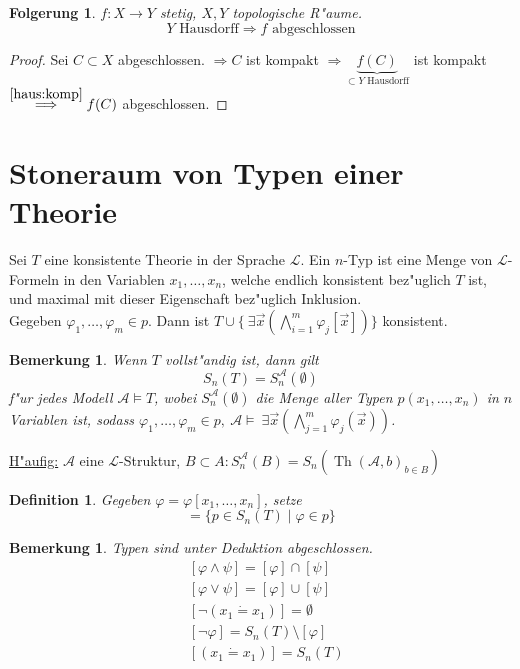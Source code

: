 \documentclass[a4paper,12pt,numbers=noenddot,parskip=full]{scrartcl}
\newcommand{\Exists}{~\exists}
\newcommand{\scrL}{\mathcal{L}}
\newcommand{\scrA}{\mathcal{A}}
\newcommand{\heading}{\underline}
\DeclareMathOperator{\Th}{Th}
\theoremstyle{dotless}
\newtheorem{corollary}[theorem]{Folgerung}
\newtheorem{definition}[theorem]{Definition}
\newtheorem{remark}[theorem]{Bemerkung}
\begin{document}
\begin{corollary}\label{huk}
	$f: X \longrightarrow Y$ stetig, $X, Y$ topologische R"aume.
	\begin{equation*}
		Y \text{ Hausdorff} \Longrightarrow f \text{ abgeschlossen}
	\end{equation*}
\end{corollary}
\begin{proof}
	Sei $C \subset X$ abgeschlossen. $\Longrightarrow C$ ist kompakt $\Longrightarrow \underbrace{f(C)}_{\subset Y \text{ Hausdorff}}$ ist kompakt $\overset{\eqref{haus:komp}}{\Longrightarrow} f(C)$ abgeschlossen.
\end{proof}

\section{Stoneraum von Typen einer Theorie}
Sei $T$ eine konsistente Theorie in der Sprache $\scrL$. Ein $n$-Typ ist eine Menge von $\scrL$-Formeln in den Variablen $x_1, \dots, x_n$, welche endlich konsistent bez"uglich $T$ ist, und maximal mit dieser Eigenschaft bez"uglich Inklusion.\\
Gegeben $\varphi_1, \dots, \varphi_m \in p$. Dann ist $T \cup \{\Exists \vec{x} (\bigwedge\limits_{i=1}^m \varphi_j[\vec{x}]) \}$ konsistent.
\begin{remark}
	Wenn $T$ vollst"andig ist, dann gilt
	\begin{equation*}
		S_n(T) = S^\scrA_n(\emptyset)
	\end{equation*}
	f"ur jedes Modell $\scrA \models T$, wobei $S^\scrA_n(\emptyset)$ die Menge aller Typen $p(x_1, \dots, x_n)$ in $n$ Variablen ist, sodass $\varphi_1, \dots, \varphi_m \in p, ~\scrA \models \Exists \vec{x}(\bigwedge\limits_{j=1}^m \varphi_j(\vec{x}))$.
\end{remark}
\heading{H"aufig:} $\scrA$ eine $\scrL$-Struktur, $B \subset A: S^\scrA_n (B) = S_n(\Th(\scrA, b)_{b \in B})$
\begin{definition}
	Gegeben $\varphi = \varphi[x_1, \dots, x_n]$, setze 
	\begin{equation*}
		[\varphi] = \{p \in S_n(T) \mid \varphi \in p \}
	\end{equation*}
\end{definition}
\begin{remark}\label{stone:basis}
	Typen sind unter Deduktion abgeschlossen.
	\begin{align*}
		&[\varphi \land \psi] = [\varphi] \cap [\psi]\\
		&[\varphi \lor \psi] = [\varphi] \cup [\psi]\\
		&[\lnot (x_1 \dot= x_1)] = \emptyset\\
		&[\lnot \varphi] = S_n(T) \setminus [\varphi]\\
		&[(x_1 \dot= x_1)] = S_n(T)
	\end{align*}
\end{remark}
\end{document}
